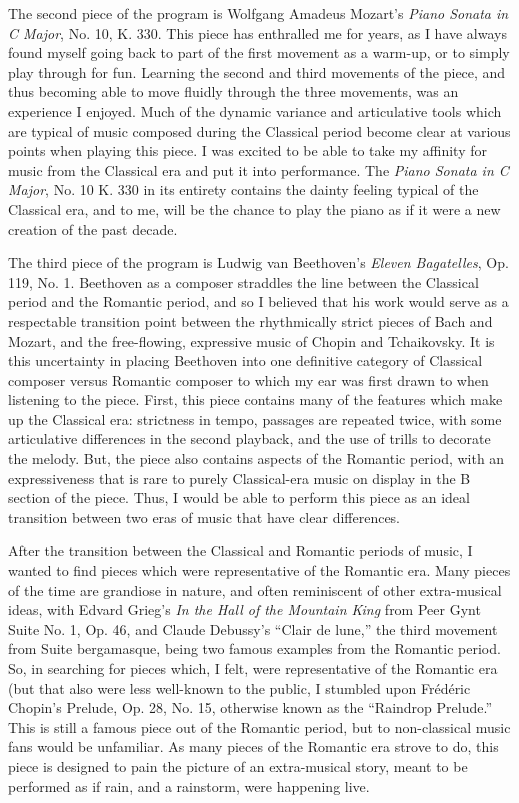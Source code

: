 The second piece of the program is Wolfgang Amadeus Mozart's \textit{Piano Sonata in C Major}, No. 10, K. 330. This piece has enthralled me for years, as I have always found myself going back to part of the first movement as a warm-up, or to simply play through for fun. Learning the second and third movements of the piece, and thus becoming able to move fluidly through the three movements, was an experience I enjoyed. Much of the dynamic variance and articulative tools which are typical of music composed during the Classical period become clear at various points when playing this piece. I was excited to be able to take my affinity for music from the Classical era and put it into performance. The \textit{Piano Sonata in C Major}, No. 10 K. 330 in its entirety contains the dainty feeling typical of the Classical era, and to me, will be the chance to play the piano as if it were a new creation of the past decade. 

The third piece of the program is Ludwig van Beethoven's \textit{Eleven Bagatelles}, Op. 119, No. 1. Beethoven as a composer straddles the line between the Classical period and the Romantic period, and so I believed that his work would serve as a respectable transition point between the rhythmically strict pieces of Bach and Mozart, and the free-flowing, expressive music of Chopin and Tchaikovsky. It is this uncertainty in placing Beethoven into one definitive category of Classical composer versus Romantic composer to which my ear was first drawn to when listening to the piece. First, this piece contains many of the features which make up the Classical era: strictness in tempo, passages are repeated twice, with some articulative differences in the second playback, and the use of trills to decorate the melody. But, the piece also contains aspects of the Romantic period, with an expressiveness that is rare to purely Classical-era music on display in the B section of the piece. Thus, I would be able to perform this piece as an ideal transition between two eras of music that have clear differences.

After the transition between the Classical and Romantic periods of music, I wanted to find pieces which were representative of the Romantic era. Many pieces of the time are grandiose in nature, and often reminiscent of other extra-musical ideas, with Edvard Grieg's \textit{In the Hall of the Mountain King} from Peer Gynt Suite No. 1, Op. 46, and Claude Debussy's ``Clair de lune,'' the third movement from Suite bergamasque, being two famous examples from the Romantic period. So, in searching for pieces which, I felt, were representative of the Romantic era (but that also were less well-known to the public, I stumbled upon Frédéric Chopin's Prelude, Op. 28, No. 15, otherwise known as the ``Raindrop Prelude.'' This is still a famous piece out of the Romantic period, but to non-classical music fans would be unfamiliar. As many pieces of the Romantic era strove to do, this piece is designed to pain the picture of an extra-musical story, meant to be performed as if rain, and a rainstorm, were happening live. 

